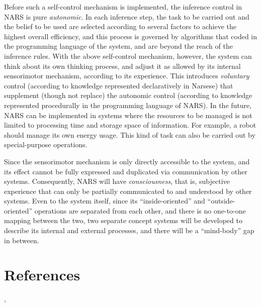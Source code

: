 Before such a self-control mechanism is implemented, the inference control in NARS is pure \emph{autonomic}. In each inference step, the task to be carried out and the belief to be used are selected according to several factors to achieve the highest overall efficiency, and this process is governed by algorithms that coded in the programming language of the system, and are beyond the reach of the inference rules. With the above self-control mechanism, however, the system can think about its own thinking process, and adjust it as allowed by its internal sensorimotor mechanism, according to its experience. This introduces \emph{voluntary} control (according to knowledge represented declaratively in Narsese) that supplement (though not replace) the autonomic control (according to knowledge represented procedurally in the programming language of NARS). In the future, NARS can be implemented in systems where the resources to be managed is not limited to processing time and storage space of information. For example, a robot should manage its own energy usage. This kind of task can also be carried out by special-purpose operations.

Since the sensorimotor mechanism is only directly accessible to the system, and its effect cannot be fully expressed and duplicated via communication by other systems. Consequently, NARS will have \emph{consciousness}, that is, subjective experience that can only be partially communicated to and understood by other systems. Even to the system itself, since its ``inside-oriented'' and ``outside-oriented'' operations are separated from each other, and there is no one-to-one mapping between the two, two separate concept systems will be developed to describe its internal and external processes, and there will be a ``mind-body'' gap in between.

\section*{References}

\cite[Chapter 5]{wp:book1}, \cite{wp:unify,wp:agi}
